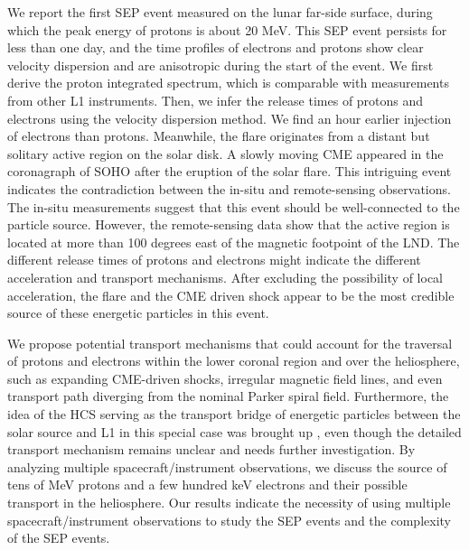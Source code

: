 We report the first \ac{SEP} event measured on the lunar far-side surface, during which the peak energy of protons is about 20 MeV. This \ac{SEP} event persists for less than one day, and the time profiles of electrons and protons show clear velocity dispersion and are anisotropic during the start of the event.
We first derive the proton integrated spectrum, which is comparable with measurements from other \acs{L1} instruments. Then, we infer the release times of protons and electrons using the velocity dispersion method. We find an hour earlier injection of electrons than protons. Meanwhile, the flare originates from a distant but solitary active region on the solar disk. A slowly moving \ac{CME} appeared in the coronagraph of \acs{SOHO} after the eruption of the solar flare.
This intriguing event indicates the contradiction between the in-situ and remote-sensing observations. The in-situ measurements suggest that this event should be well-connected to the particle source. However, the remote-sensing data show that the active region is located at more than 100 degrees east of the magnetic footpoint of the \ac{LND}. The different release times of protons and electrons might indicate the different acceleration and transport mechanisms.
After excluding the possibility of local acceleration, the flare and the \ac{CME} driven shock appear to be the most credible source of these energetic particles in this event. 

We propose potential transport mechanisms that could account for the traversal of protons and electrons within the lower coronal region and over the heliosphere, such as expanding \ac{CME}-driven shocks, irregular magnetic field lines, and even transport path diverging from the nominal Parker spiral field. Furthermore, the idea of the \ac{HCS} serving as the transport bridge of energetic particles between the solar source and \acs{L1} in this special case was brought up \citep{Battarbee2018ApJ}, even though the detailed transport mechanism remains unclear and needs further investigation. 
By analyzing multiple spacecraft/instrument observations, we discuss the source of tens of MeV protons and a few hundred keV electrons and their possible transport in the heliosphere. Our results indicate the necessity of using multiple spacecraft/instrument observations to study the \ac{SEP} events and the complexity of the \ac{SEP} events.



